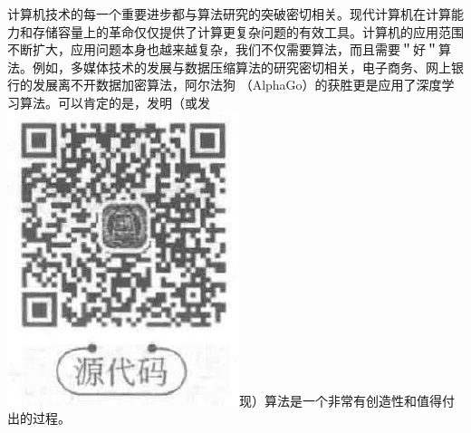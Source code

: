 \documentclass[10pt]{article}
\begin{document}
计算机技术的每一个重要进步都与算法研究的突破密切相关。现代计算机在计算能力和存储容量上的革命仅仅提供了计算更复杂问题的有效工具。计算机的应用范围不断扩大，应用问题本身也越来越复杂，我们不仅需要算法，而且需要＂好＂算法。例如，多媒体技术的发展与数据压缩算法的研究密切相关，电子商务、网上银行的发展离不开数据加密算法，阿尔法狗 （AlphaGo）的获胜更是应用了深度学习算法。可以肯定的是，发明（或发\\
\includegraphics[max width=\textwidth]{2025_06_06_704745ea57b15b2333e5g-020}现）算法是一个非常有创造性和值得付出的过程。
\end{document}
